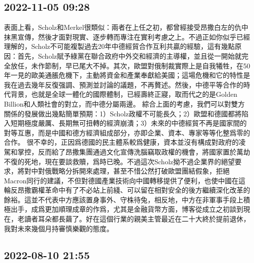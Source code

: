 \documentclass[twocolumn]{ctexart}
\begin{document}
\subsection*{2022-11-05 09:28}

表面上看，Scholz和Merkel很類似：兩者在上任之初，都曾經接受昂撒白左的仇中抹黑宣傳，然後才面對現實、逐步轉而專注在實利考慮之上。不過正如你似乎已經理解的，Scholz不可能複製過去20年中德經貿合作互利共贏的經驗，這有幾點原因：首先，Scholz賦予綠黨在聯合政府中外交和經濟的主導權，並且從一開始就完全放任，未作節制，早已尾大不掉。其次，歐盟對俄制裁實際上是自我犧牲，在50年一見的歐美通脹危機下，主動將資金和產業奉獻給美國；這場危機和它的特性是我在過去幾年反復强調、預測並討論的議題，不再贅述。然後，中德平等合作的時代背景，也就是全球一體化的國際體制，已經壽終正寢，取而代之的是Golden Billion和人類社會的對立，而中德分屬兩邊。
綜合上面的考慮，我們可以對雙方關係的發展做出幾點簡單預期：1）Scholz政權不可能長久；2）歐盟和德國都將陷入短期極度嚴厲、長期無可扭轉的經濟崩潰；3）未來的中德經貿不再是國家間的對等互惠，而是中國和德方經濟組成部分，亦即企業、資本、專家等等化整爲零的合作。
很不幸的，正因爲德國的民主體系較爲健康，資本並沒有構成對政府的凌駕和掌控，反而給了昂撒集團通過文化宣傳洗腦竊取政權的機會，將國家置於萬劫不復的死地，現在要談救贖，爲時已晚。不過這次Scholz拗不過企業界的絕望要求，將對中對俄戰略分拆開來處理，甚至不惜公然打破歐盟團結假象，拒絕Macron同行的建議，不但對德國產業技術向中國轉移提供了便利，也使中國在這輪反昂撒霸權革命中有了不必站上前綫、可以留在相對安全的後方繼續深化改革的餘裕。這並不代表中方應該置身事外、守株待兔，相反地，中方在非軍事手段上積極出手，成爲更加順理成章的作爲，尤其是金融貨幣方面，博客從成立之初談到現在，老讀者耳朵都長繭了。好在這個行業的親美主管最近在二十大終於提前退休，我對未來幾個月持審慎樂觀的態度。
\subsection*{2022-08-10 21:55}
\end{document}
